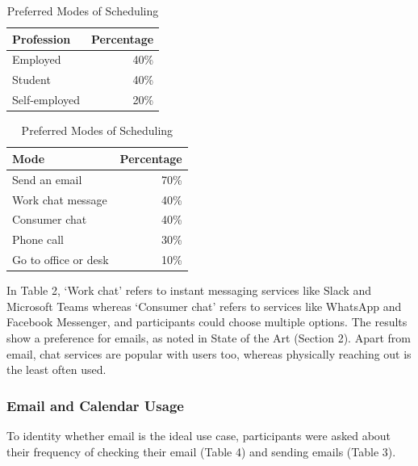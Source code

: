 \documentclass{article}
\begin{document}
\begin{table}[!htb]
	\begin{minipage}{.5\linewidth}
		\caption{Professions of Participants}
		\centering
		\begin{tabular}{lr}
			\hline
			\textbf{Profession} & \textbf{Percentage} \\
			\hline
			Employed            & 40\%                \\
			Student             & 40\%                \\
			Self-employed       & 20\%                \\
			\hline
		\end{tabular}
	\end{minipage}%
	\hspace{.1cm}
	\begin{minipage}{.5\linewidth}
		\centering
		\caption{Preferred Modes of Scheduling}
		\begin{tabular}{lr}
			\hline
			\textbf{Mode}        & \textbf{Percentage} \\
			\hline
			Send an email        & 70\%                \\
			Work chat message    & 40\%                \\
			Consumer chat        & 40\%                \\
			Phone call           & 30\%                \\
			Go to office or desk & 10\%                \\
			\hline
		\end{tabular}
	\end{minipage} 
\end{table}

In Table 2, `Work chat' refers to instant messaging services like Slack and Microsoft Teams whereas `Consumer chat' refers to services like WhatsApp and Facebook Messenger, and participants could choose multiple options. The results show a preference for emails, as noted in State of the Art (Section 2). Apart from email, chat services are popular with users too, whereas physically reaching out is the least often used.

\subsubsection{Email and Calendar Usage}

To identity whether email is the ideal use case, participants were asked about their frequency of checking their email (Table 4) and sending emails (Table 3).
\end{document}
